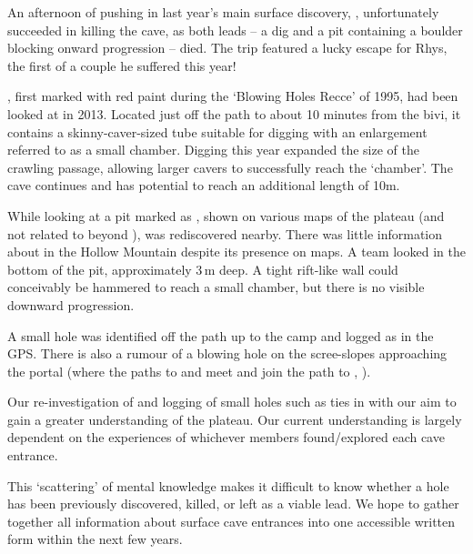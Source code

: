 An afternoon of pushing in last year's main surface discovery, , unfortunately succeeded in killing the cave, as both leads – a dig and a pit containing a boulder blocking onward progression – died. The trip featured a lucky escape for Rhys, the first of a couple he suffered this year!

, first marked with red paint during the `Blowing Holes Recce' of 1995, had been looked at in 2013. Located just off the path to  about 10 minutes from the bivi, it contains a skinny-caver-sized tube suitable for digging with an enlargement referred to as a small chamber. Digging this year expanded the size of the crawling passage, allowing larger cavers to successfully reach the `chamber'. The cave continues and  has potential to reach an additional length of 10m.

While looking at  a pit marked as , shown on various maps of the plateau (and not related to  beyond ), was rediscovered nearby. There was little information about  in the Hollow Mountain despite its presence on maps. A team looked in the bottom of the pit, approximately 3\,m deep. A tight rift-like wall could conceivably be hammered to reach a small chamber, but there is no visible downward progression. 

A small hole was identified off the path up to the camp and logged as  in the GPS. There is also a rumour of a blowing hole on the scree-slopes approaching the portal (where the paths to  and  meet and join the path to , ).


Our re-investigation of  and logging of small holes such as  ties in with our aim to gain a greater understanding of the plateau. Our current understanding is largely dependent on the experiences of whichever members found/explored each cave entrance.

This `scattering' of mental knowledge makes it difficult to know whether a hole has been previously discovered, killed, or left as a viable lead. We hope to gather together all information about surface cave entrances into one accessible written form within the next few years.

 
